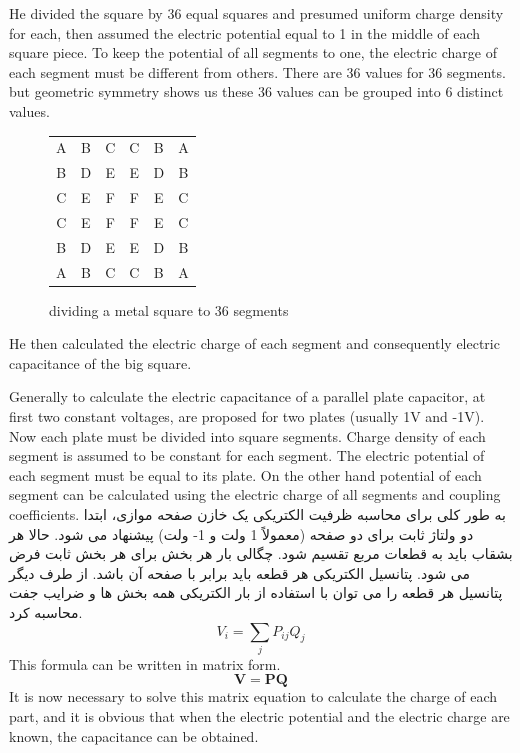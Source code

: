\documentclass[final,5p,times,twocolumn]{elsarticle}
\begin{document}
He divided the square by 36 equal squares and presumed uniform charge density for each, then assumed the electric potential equal to 1 in the middle of each square piece. To keep the potential of all segments to one, the electric charge of each segment must be different from others. There are 36 values for 36 segments. but geometric symmetry shows us these 36 values can be grouped into 6 distinct values.
\begin {figure}
\center
\begin{tabular}{ c c c c c c }
  A & B & C & C & B & A \\
  B & D & E & E & D & B \\
  C & E & F & F & E & C \\
  C & E & F & F & E & C \\
  B & D & E & E & D & B \\
  A & B & C & C & B & A \\
\end{tabular}
\caption{dividing a metal square to 36 segments}
\end{figure}
He then calculated the electric charge of each segment and consequently electric capacitance of the big square.

Generally to calculate the electric capacitance of a parallel plate capacitor, at first two constant voltages, are proposed for two plates (usually 1V and -1V). Now each plate must be divided into square segments. Charge density of each segment is assumed to be constant for each segment. The electric potential of each segment must be equal to its plate. On the other hand potential of each segment can be calculated using the electric charge of all segments and coupling coefficients.
به طور کلی برای محاسبه ظرفیت الکتریکی یک خازن صفحه موازی، ابتدا دو ولتاژ ثابت برای دو صفحه (معمولاً 1 ولت و 1- ولت) پیشنهاد می شود. حالا هر بشقاب باید به قطعات مربع تقسیم شود. چگالی بار هر بخش برای هر بخش ثابت فرض می شود. پتانسیل الکتریکی هر قطعه باید برابر با صفحه آن باشد. از طرف دیگر پتانسیل هر قطعه را می توان با استفاده از بار الکتریکی همه بخش ها و ضرایب جفت محاسبه کرد.
\begin{equation}
\label{eq1}
V_i = \sum_j P_{ij} Q_j
\end{equation}
This formula can be written in matrix form.
\begin{equation}
\label{eq2}
\mathbf V = \mathbf P \mathbf Q
\end{equation}
It is now necessary to solve this matrix equation to calculate the charge of each part, and it is obvious that when the electric potential and the electric charge are known, the capacitance can be obtained.
 
\end{document}
